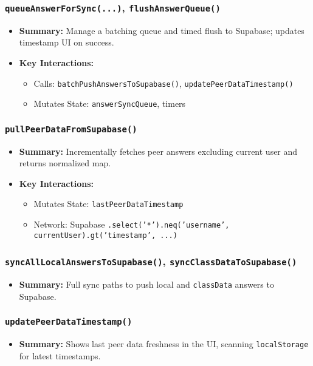 \documentclass[11pt,letterpaper]{article}
\begin{document}
\subsubsection{\texttt{queueAnswerForSync(...)}, \texttt{flushAnswerQueue()}}
\begin{itemize}
    \item \textbf{Summary:} Manage a batching queue and timed flush to Supabase; updates timestamp UI on success.
    \item \textbf{Key Interactions:}
    \begin{itemize}
        \item Calls: \texttt{batchPushAnswersToSupabase()}, \texttt{updatePeerDataTimestamp()}
        \item Mutates State: \texttt{answerSyncQueue}, timers
    \end{itemize}
\end{itemize}

\subsubsection{\texttt{pullPeerDataFromSupabase()}}
\begin{itemize}
    \item \textbf{Summary:} Incrementally fetches peer answers excluding current user and returns normalized map.
    \item \textbf{Key Interactions:}
    \begin{itemize}
        \item Mutates State: \texttt{lastPeerDataTimestamp}
        \item Network: Supabase \texttt{.select('*').neq('username', currentUser).gt('timestamp', ...)}
    \end{itemize}
\end{itemize}

\subsubsection{\texttt{syncAllLocalAnswersToSupabase()}, \texttt{syncClassDataToSupabase()}}
\begin{itemize}
    \item \textbf{Summary:} Full sync paths to push local and \texttt{classData} answers to Supabase.
\end{itemize}

\subsubsection{\texttt{updatePeerDataTimestamp()}}
\begin{itemize}
    \item \textbf{Summary:} Shows last peer data freshness in the UI, scanning \texttt{localStorage} for latest timestamps.
\end{itemize}
\end{document}
